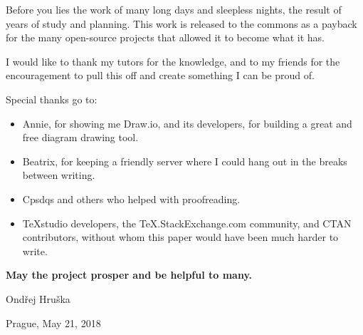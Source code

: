 \begin{thanks}

Before you lies the work of many long days and sleepless nights, the result of years of study and planning. This work is released to the commons as a payback for the many open-source projects that allowed it to become what it has.

I would like to thank my tutors for the knowledge, and to my friends for the encouragement to pull this off and create something I can be proud of. 

\vspace{10pt}
\noindent
Special thanks go to:

\vspace{-10pt}
\begin{itemize}
\item Annie, for showing me Draw.io, and its developers, for building a great and free diagram drawing tool.
\item Beatrix, for keeping a friendly server where I could hang out in the breaks between writing.
\item Cpsdqs and others who helped with proofreading.
\item TeXstudio developers, the TeX.StackExchange.com community, and CTAN contributors, without whom this paper would have been much harder to write.
\end{itemize}

\noindent
\textbf{May the project prosper and be helpful to many.}

\vspace{25pt}
\noindent
Ondřej Hruška

\noindent
Prague, May 21, 2018

\end{thanks}
